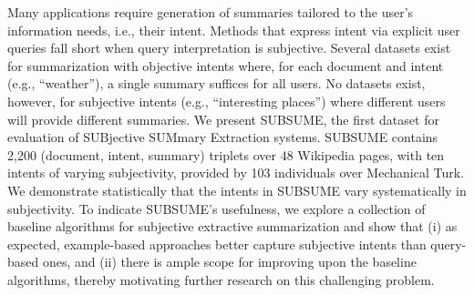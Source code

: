 Many applications require generation of summaries tailored to the user's information needs, i.e., their intent. Methods that express intent via explicit user queries fall short when query interpretation is subjective. Several datasets exist for summarization with objective intents where, for each document and intent (e.g., ``weather''), a single summary suffices for all users. No datasets exist, however, for subjective intents (e.g., ``interesting places'') where different users will provide different summaries. We present SUBSUME, the first dataset for evaluation of SUBjective SUMmary Extraction systems. SUBSUME contains 2,200 (document, intent, summary) triplets over 48 Wikipedia pages, with ten intents of varying subjectivity, provided by 103 individuals over Mechanical Turk. We demonstrate statistically that the intents in SUBSUME vary systematically in subjectivity. To indicate SUBSUME's usefulness, we explore a collection of baseline algorithms for subjective extractive summarization and show that (i) as expected, example-based approaches better capture subjective intents than query-based ones, and (ii) there is ample scope for improving upon the baseline algorithms, thereby motivating further research on this challenging problem.

